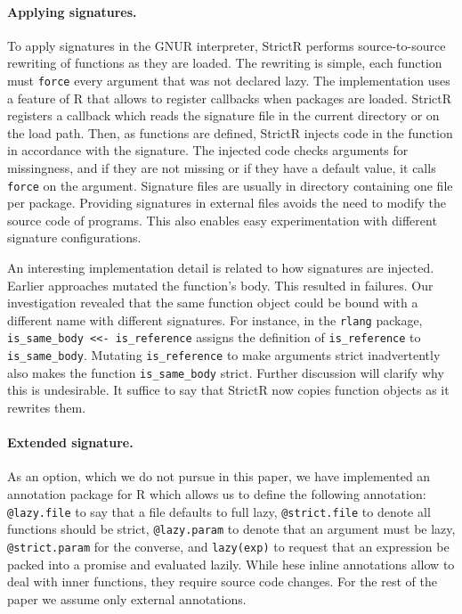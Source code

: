 \documentclass[review,nonacm,screen,acmsmall,anonymous=true]{acmart}
\newcommand{\code}[1]{\lstinline |#1|\xspace}
\renewcommand{\c}[1]{\lstinline |#1|\xspace}
\newcommand{\strictr}{{\sf StrictR}\xspace}
\begin{document}
\paragraph{Applying signatures.}
To apply signatures in the GNUR interpreter, \strictr performs source-to-source
rewriting of functions as they are loaded. The rewriting is simple, each
function must \c{force} every argument that was not declared lazy. The
implementation uses a feature of R that allows to register callbacks when
packages are loaded. \strictr registers a callback which reads the signature
file in the current directory or on the load path. Then, as functions are
defined, \strictr injects code in the function in accordance with the signature.
The injected code checks arguments for missingness, and if they are not missing
or if they have a default value, it calls \c{force} on the argument. Signature
files are usually in directory containing one file per package. Providing
signatures in external files avoids the need to modify the source code of
programs. This also enables easy experimentation with different signature
configurations.

An interesting implementation detail is related to how signatures are injected.
Earlier approaches mutated the function's body. This resulted in failures.
Our investigation revealed that the same function object could be bound with a
different name with different signatures. For instance, in the \code{rlang}
package, \code{is_same_body <<- is_reference} assigns the definition of
\code{is_reference} to \code{is_same_body}. Mutating \code{is_reference} to make
arguments strict inadvertently also makes the function \code{is_same_body}
strict. Further discussion will clarify why this is undesirable. It suffice to
say that \strictr now copies function objects as it rewrites them.

\paragraph{Extended signature.}
As an option, which we do not pursue in this paper, we have implemented an
annotation package for R which allows us to define the following annotation:
\c{@lazy.file} to say that a file defaults to full lazy, \c{@strict.file} to
denote all functions should be strict, \c{@lazy.param} to denote that an
argument must be lazy, \c{@strict.param} for the converse, and \c{lazy(exp)} to
request that an expression be packed into a promise and evaluated lazily. While
hese inline annotations allow to deal with inner functions, they require source
code changes. For the rest of the paper we assume only external annotations.
\end{document}
